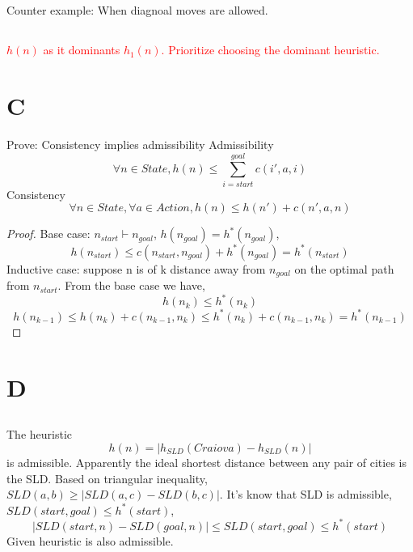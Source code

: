 \documentclass{article}
\begin{document}
\subsection{}
Counter example: When diagnoal moves are allowed.

\subsection{} 
\textcolor{red}{$h(n)$ as it dominants $h_1(n)$. Prioritize choosing the dominant heuristic.}
\section{C}
Prove: Consistency implies admissibility\newline
Admissibility
\begin{equation}
    \forall n \in State, h(n) \leq \sum_{i = start}^{goal}c(i', a, i)
\end{equation}
Consistency
\begin{equation}
    \forall n \in State, \forall a \in Action, h(n) \leq h(n') + c(n', a, n)
\end{equation}
\begin{proof}
    Base case: $n_{start} \vdash n_{goal}$, $h(n_{goal}) = h^*(n_{goal})$, 
    \[h(n_{start}) \leq c(n_{start}, n_{goal}) + h^*(n_{goal}) = h^*(n_{start})\]
    Inductive case: suppose n is of k distance away from $n_{goal}$ on the optimal path from $n_{start}$. From the base case we have, 
    \[h(n_k) \leq h^*(n_k)\]
    \[h(n_{k-1}) \leq h(n_k) + c(n_{k-1}, n_k) \leq h^*(n_k) + c(n_{k-1}, n_k) = h^*(n_{k-1})\]


\end{proof}
\section{D}
\subsection{}
\subsection{}
The heuristic \[h(n) = |h_{SLD}(Craiova) - h_{SLD}(n)|\] is admissible.\newline
Apparently the ideal shortest distance between any pair of cities is the SLD. Based on triangular inequality, 
$SLD(a, b) \geq |SLD(a, c) - SLD(b, c)|$. 
It's know that SLD is admissible, $SLD(start, goal) \leq h^*(start)$, 
\[|SLD(start, n) - SLD(goal, n)| \leq SLD(start, goal) \leq h^*(start)\]
Given heuristic is also admissible.


\end{document}
